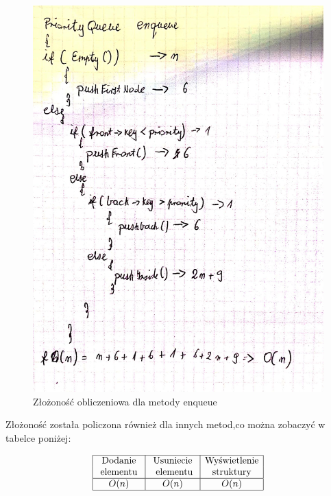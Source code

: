 \documentclass{article}
\begin{document}
\begin{figure}[H]
    \centering
    \hspace*{-1cm}
    \includegraphics[totalheight=10cm]{zlozonosc.jpg}
    \caption{Złożoność obliczeniowa dla metody enqueue}
    \label{2}
\end{figure}

Złożoność została policzona również dla innych metod,co można zobaczyć w tabelce poniżej:

\begin{equation}
    \begin{array}{|c|c|c|}
    \hline \text { Dodanie } & \text { Usuniecie } & \text{Wyświetlenie} \\
    \text { elementu } & \text { elementu} & \text{struktury}\\
    \hline O(n) & O(n) & O(n)  \\
    \hline
    \end{array}
    \end{equation}
\end{document}
